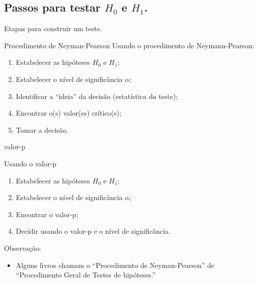 \documentclass[8pt]{beamer}
\begin{document}
\subsection{Passos para testar $H_0$ e $H_1$.}

\begin{frame}{Etapas para construir um teste.}

\normalsize

\begin{block}{Procedimento de Neyman-Pearson}
 Usando o procedimento de Neymann-Pearson:
 \begin{enumerate}[1)]
  \item Estabelecer as hipóteses $H_0$ e $H_1$;
  \vfill
  
  \item Estabelecer o nível de significância $\alpha$;
  \vfill
  
  \item Identificar a ``ideia'' da decisão (estatística do teste);
  \vfill
  
  \item Encontrar o(s) valor(es) crítico(s);
  \vfill
  
  \item Tomar a decisão.
 \end{enumerate}
\end{block}

\begin{block}{valor-p}
 
 Usando o valor-p
 \begin{enumerate}[1)]
    \item Estabelecer as hipóteses $H_0$ e $H_1$;
  \vfill
  
  \item Estabelecer o nível de significância $\alpha$;
  \vfill
  
  \item Encontrar o valor-p;
  \vfill
  
  \item Decidir usando o valor-p e o nível de significância.
 \end{enumerate}
\end{block}

Observação:
\begin{itemize}
	\item Alguns livros chamam o ``Procedimento de Neyman-Pearson'' de ``Procedimento Geral de Testes de hipóteses.''
\end{itemize}



\normalsize
\end{frame}
\end{document}
